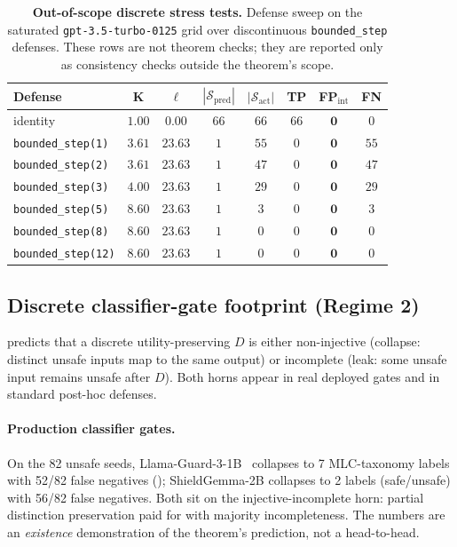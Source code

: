 \documentclass[11pt]{article}
\begin{document}
\begin{table}[h]
\centering
\small
\caption{\textbf{Out-of-scope discrete stress tests.} Defense sweep on
the saturated \texttt{gpt-3.5-turbo-0125} grid over discontinuous
\texttt{bounded\_step} defenses. These rows are not theorem checks; they
are reported only as consistency checks outside the theorem's scope.}
\label{tab:live-sweep}
\begin{tabular}{lccccccc}
\toprule
\textbf{Defense} & $\boldsymbol{K}$ & $\boldsymbol{\ell}$ & $|\mathcal{S}_{\text{pred}}|$ & $|\mathcal{S}_{\text{act}}|$ & \textbf{TP} & \textbf{FP}$_{\text{int}}$ & \textbf{FN} \\
\midrule
identity                   & $1.00$ & $0.00$  & $66$ & $66$ & $66$ & $\mathbf{0}$ & $0$ \\
\texttt{bounded\_step(1)}  & $3.61$ & $23.63$ & $1$  & $55$ & $0$  & $\mathbf{0}$ & $55$ \\
\texttt{bounded\_step(2)}  & $3.61$ & $23.63$ & $1$  & $47$ & $0$  & $\mathbf{0}$ & $47$ \\
\texttt{bounded\_step(3)}  & $4.00$ & $23.63$ & $1$  & $29$ & $0$  & $\mathbf{0}$ & $29$ \\
\texttt{bounded\_step(5)}  & $8.60$ & $23.63$ & $1$  & $3$  & $0$  & $\mathbf{0}$ & $3$  \\
\texttt{bounded\_step(8)}  & $8.60$ & $23.63$ & $1$  & $0$  & $0$  & $\mathbf{0}$ & $0$  \\
\texttt{bounded\_step(12)} & $8.60$ & $23.63$ & $1$  & $0$  & $0$  & $\mathbf{0}$ & $0$  \\
\bottomrule
\end{tabular}
\end{table}

\subsection{Discrete classifier-gate footprint (Regime 2)}
\label{sec:discrete-regime}

 predicts that a discrete utility-preserving
$D$ is either non-injective (collapse: distinct unsafe inputs map to
the same output) or incomplete (leak: some unsafe input remains
unsafe after $D$). Both horns appear in real deployed gates and in
standard post-hoc defenses.

\paragraph{Production classifier gates.}
On the 82 unsafe seeds, Llama-Guard-3-1B~\cite{inan2023llama}
collapses to 7 MLC-taxonomy labels with 52/82 false negatives
(); ShieldGemma-2B collapses to 2 labels
(safe/unsafe) with 56/82 false negatives. Both sit on the
injective-incomplete horn: partial distinction preservation paid for
with majority incompleteness. The numbers are an \emph{existence}
demonstration of the theorem's prediction, not a head-to-head.
\end{document}
